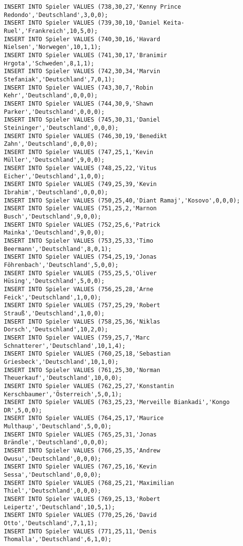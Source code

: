 \documentclass{bschlangaul-aufgabe}
\begin{document}
\begin{verbatim}
INSERT INTO Spieler VALUES (738,30,27,'Kenny Prince Redondo','Deutschland',3,0,0);
INSERT INTO Spieler VALUES (739,30,10,'Daniel Keita-Ruel','Frankreich',10,5,0);
INSERT INTO Spieler VALUES (740,30,16,'Havard Nielsen','Norwegen',10,1,1);
INSERT INTO Spieler VALUES (741,30,17,'Branimir Hrgota','Schweden',8,1,1);
INSERT INTO Spieler VALUES (742,30,34,'Marvin Stefaniak','Deutschland',7,0,1);
INSERT INTO Spieler VALUES (743,30,7,'Robin Kehr','Deutschland',0,0,0);
INSERT INTO Spieler VALUES (744,30,9,'Shawn Parker','Deutschland',0,0,0);
INSERT INTO Spieler VALUES (745,30,31,'Daniel Steininger','Deutschland',0,0,0);
INSERT INTO Spieler VALUES (746,30,19,'Benedikt Zahn','Deutschland',0,0,0);
INSERT INTO Spieler VALUES (747,25,1,'Kevin Müller','Deutschland',9,0,0);
INSERT INTO Spieler VALUES (748,25,22,'Vitus Eicher','Deutschland',1,0,0);
INSERT INTO Spieler VALUES (749,25,39,'Kevin Ibrahim','Deutschland',0,0,0);
INSERT INTO Spieler VALUES (750,25,40,'Diant Ramaj','Kosovo',0,0,0);
INSERT INTO Spieler VALUES (751,25,2,'Marnon Busch','Deutschland',9,0,0);
INSERT INTO Spieler VALUES (752,25,6,'Patrick Mainka','Deutschland',9,0,0);
INSERT INTO Spieler VALUES (753,25,33,'Timo Beermann','Deutschland',8,0,1);
INSERT INTO Spieler VALUES (754,25,19,'Jonas Föhrenbach','Deutschland',5,0,0);
INSERT INTO Spieler VALUES (755,25,5,'Oliver Hüsing','Deutschland',5,0,0);
INSERT INTO Spieler VALUES (756,25,28,'Arne Feick','Deutschland',1,0,0);
INSERT INTO Spieler VALUES (757,25,29,'Robert Strauß','Deutschland',1,0,0);
INSERT INTO Spieler VALUES (758,25,36,'Niklas Dorsch','Deutschland',10,2,0);
INSERT INTO Spieler VALUES (759,25,7,'Marc Schnatterer','Deutschland',10,1,4);
INSERT INTO Spieler VALUES (760,25,18,'Sebastian Griesbeck','Deutschland',10,1,0);
INSERT INTO Spieler VALUES (761,25,30,'Norman Theuerkauf','Deutschland',10,0,0);
INSERT INTO Spieler VALUES (762,25,27,'Konstantin Kerschbaumer','Österreich',5,0,1);
INSERT INTO Spieler VALUES (763,25,23,'Merveille Biankadi','Kongo DR',5,0,0);
INSERT INTO Spieler VALUES (764,25,17,'Maurice Multhaup','Deutschland',5,0,0);
INSERT INTO Spieler VALUES (765,25,31,'Jonas Brändle','Deutschland',0,0,0);
INSERT INTO Spieler VALUES (766,25,35,'Andrew Owusu','Deutschland',0,0,0);
INSERT INTO Spieler VALUES (767,25,16,'Kevin Sessa','Deutschland',0,0,0);
INSERT INTO Spieler VALUES (768,25,21,'Maximilian Thiel','Deutschland',0,0,0);
INSERT INTO Spieler VALUES (769,25,13,'Robert Leipertz','Deutschland',10,5,1);
INSERT INTO Spieler VALUES (770,25,26,'David Otto','Deutschland',7,1,1);
INSERT INTO Spieler VALUES (771,25,11,'Denis Thomalla','Deutschland',6,1,0);

\end{verbatim}
\end{document}
